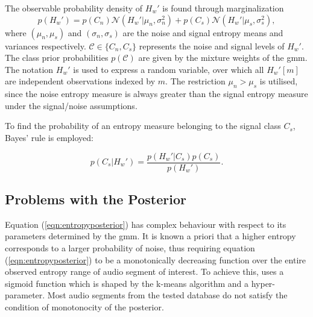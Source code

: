 {The observable probability density of $H_w'$ is found through marginalization
\begin{equation}
    p(H_w') = p(C_n)\mathcal{N}(H_w' | \mu_n, \sigma_n^2) + p(C_s)\mathcal{N}(H_w' | \mu_s, \sigma_s^2),
\end{equation}
 where $(\mu_n,\mu_s)$ and $(\sigma_n, \sigma_s)$ are the noise and signal entropy means and variances respectively. $\mathcal{C} \in \{C_n ,C_s\}$ represents the noise and signal levels of $H_w'$. The class prior probabilities $p(\mathcal{C})$ are given by the mixture weights of the \ac{gmm}. The notation $H_w'$ is used to express a random variable, over which all $H_w'[m]$ are independent observations indexed by $m$. The restriction $\mu_n > \mu_s$ is utilised, since the noise entropy measure is always greater than the signal entropy measure under the signal/noise assumptions. 
 
To find the probability of an entropy measure belonging to the signal class $C_s$, Bayes' rule is employed:

\begin{equation}
\label{eqn:entropyposterior}
    p(C_s|H_w') = \frac{p(H_w' | C_s) p(C_s)}{p(H_w')}.
\end{equation}




\subsection{Problems with the Posterior}
Equation (\ref{eqn:entropyposterior}) has complex behaviour with respect to its parameters determined by the \ac{gmm}. It is known a priori that a higher entropy corresponds to a larger probability of noise, thus requiring equation (\ref{eqn:entropyposterior}) to be a monotonically decreasing function over the entire observed entropy range of audio segment of interest. To achieve this, \citet{mypaper} uses a sigmoid function which is shaped by the k-means algorithm and a hyper-parameter. Most audio segments from the tested database do not satisfy the condition of monotonocity of the posterior. 

}
